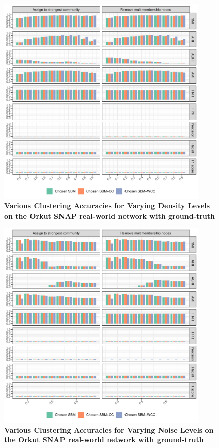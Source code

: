 \documentclass[aps,pre,superscriptaddress]{article}
\begin{document}
\begin{figure}[!htpb]
	\centering
	\includegraphics[width=0.9\textwidth]{figures/density_orkut_accuracy.pdf}
	\caption[]{\textbf{Various Clustering Accuracies for Varying Density Levels on the Orkut SNAP real-world network with ground-truth}}
	\label{fig:density-orkut-acuracy}
\end{figure}

\begin{figure}[!htpb]
	\centering
	\includegraphics[width=0.9\textwidth]{figures/noise_orkut_accuracy.pdf}
	\caption[]{\textbf{Various Clustering Accuracies for Varying Noise Levels on the Orkut SNAP real-world network with ground-truth}}
	\label{fig:noise-orkut-acuracy}
\end{figure}
\end{document}
